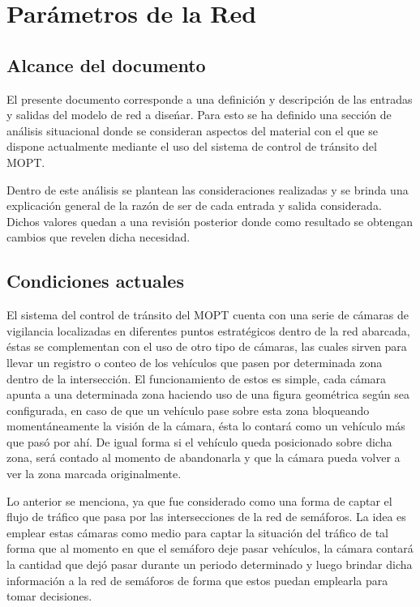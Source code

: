 \section{Par\'{a}metros de la Red}

\subsection{Alcance del documento}

El presente documento corresponde a una definici\'{o}n y descripci\'{o}n de las entradas y salidas del modelo de red a dise\'{n}ar. Para esto se ha definido una secci\'{o}n de an\'{a}lisis situacional donde se consideran aspectos del material con el que se dispone actualmente mediante el uso del sistema de control de tr\'{a}nsito del MOPT.

Dentro de este an\'{a}lisis se plantean las consideraciones realizadas y se brinda una explicaci\'{o}n general de la raz\'{o}n de ser de cada entrada y salida considerada. Dichos valores quedan a una revisi\'{o}n posterior donde como resultado se obtengan cambios que revelen dicha necesidad.


\subsection{Condiciones actuales}

El sistema del control de tr\'{a}nsito del MOPT cuenta con una serie de c\'{a}maras de vigilancia localizadas en diferentes puntos estrat\'{e}gicos dentro de la red abarcada, \'{e}stas se complementan con el uso de otro tipo de c\'{a}maras, las cuales sirven para llevar un registro o conteo de los veh\'{i}culos que pasen por determinada zona dentro de la intersecci\'{o}n. El funcionamiento de estos es simple, cada c\'{a}mara apunta a una determinada zona haciendo uso de una figura geom\'{e}trica seg\'{u}n sea configurada, en caso de que un veh\'{i}culo pase sobre esta zona bloqueando moment\'{a}neamente la visi\'{o}n de la c\'{a}mara, \'{e}sta lo contar\'{a} como un veh\'{i}culo m\'{a}s que pas\'{o} por ah\'{i}. De igual forma si el veh\'{i}culo queda posicionado sobre dicha zona, ser\'{a} contado al momento de abandonarla y que la c\'{a}mara pueda volver a ver la zona marcada originalmente.

Lo anterior se menciona, ya que fue considerado como una forma de captar el flujo de tr\'{a}fico que pasa por las intersecciones de la red de sem\'{a}foros. La idea es emplear estas c\'{a}maras como medio para captar la situaci\'{o}n del tr\'{a}fico de tal forma que al momento en que el sem\'{a}foro deje pasar veh\'{i}culos, la c\'{a}mara contar\'{a} la cantidad que dej\'{o} pasar durante un periodo determinado y luego brindar dicha informaci\'{o}n a la red de sem\'{a}foros de forma que estos puedan emplearla para tomar decisiones.

